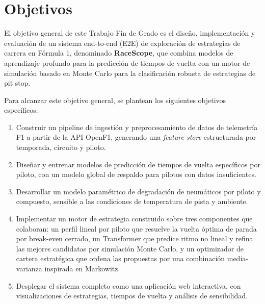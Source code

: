 \section{Objetivos}
\label{sec:objetivos}


El objetivo general de este Trabajo Fin de Grado es el diseño, implementación y evaluación de un sistema end-to-end (E2E) de exploración de estrategias de carrera en Fórmula 1, denominado \textbf{RaceScope}, que combina modelos de aprendizaje profundo para la predicción de tiempos de vuelta con un motor de simulación basado en Monte Carlo para la clasificación robusta de estrategias de pit stop.

Para alcanzar este objetivo general, se plantean los siguientes objetivos específicos:
\begin{enumerate}
    \item Construir un pipeline de ingestión y preprocesamiento de datos de telemetría F1 a partir de la API OpenF1, generando una \textit{feature store} estructurada por temporada, circuito y piloto.

    \item Diseñar y entrenar modelos de predicción de tiempos de vuelta específicos por piloto, con un modelo global de respaldo para pilotos con datos insuficientes.

    \item Desarrollar un modelo paramétrico de degradación de neumáticos por piloto y compuesto, sensible a las condiciones de temperatura de pista y ambiente.

    \item Implementar un motor de estrategia construido sobre tres componentes que colaboran: un perfil lineal por piloto que resuelve la vuelta óptima de parada por break-even cerrado, un Transformer que predice ritmo no lineal y refina las mejores candidatas por simulación Monte Carlo, y un optimizador de cartera estratégica que ordena las propuestas por una combinación media-varianza inspirada en Markowitz.

    \item Desplegar el sistema completo como una aplicación web interactiva, con visualizaciones
          de estrategias, tiempos de vuelta y análisis de sensibilidad.
\end{enumerate}

